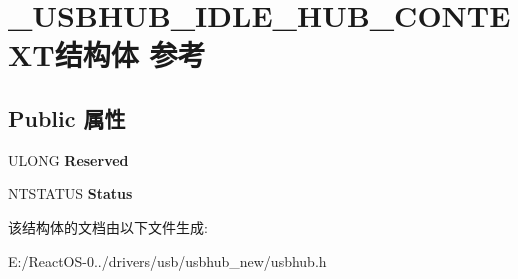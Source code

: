\hypertarget{struct___u_s_b_h_u_b___i_d_l_e___h_u_b___c_o_n_t_e_x_t}{}\section{\+\_\+\+U\+S\+B\+H\+U\+B\+\_\+\+I\+D\+L\+E\+\_\+\+H\+U\+B\+\_\+\+C\+O\+N\+T\+E\+X\+T结构体 参考}
\label{struct___u_s_b_h_u_b___i_d_l_e___h_u_b___c_o_n_t_e_x_t}
\subsection*{Public 属性}
\begin{DoxyCompactItemize}
\item 
\mbox{\label{struct___u_s_b_h_u_b___i_d_l_e___h_u_b___c_o_n_t_e_x_t_a20e0b9b8d44a160a4c6d2f518a65d02b}} 
U\+L\+O\+NG {\bfseries Reserved}
\item 
\mbox{\label{struct___u_s_b_h_u_b___i_d_l_e___h_u_b___c_o_n_t_e_x_t_a624998646a7f3cff39b24bc760d770f0}} 
N\+T\+S\+T\+A\+T\+US {\bfseries Status}
\end{DoxyCompactItemize}


该结构体的文档由以下文件生成\+:\begin{DoxyCompactItemize}
\item 
E\+:/\+React\+O\+S-\/0../drivers/usb/usbhub\+\_\+new/usbhub.\+h\end{DoxyCompactItemize}
